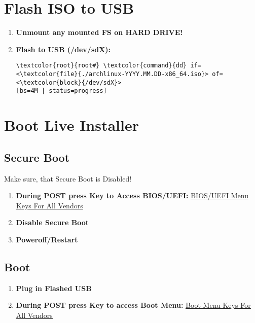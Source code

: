 \documentclass[10pt, a4paper, onecolumn, openany]{book} %
\begin{document}
\section{Flash ISO to USB}
\begin{enumerate}
    \item \textbf{Unmount any mounted FS on HARD DRIVE!}
    \item \textbf{Flash to USB (/dev/sdX):}
\begin{Verbatim}[commandchars=\\\{\}]
\textcolor{root}{root#} \textcolor{command}{dd} if=<\textcolor{file}{./archlinux-YYYY.MM.DD-x86_64.iso}> of=<\textcolor{block}{/dev/sdX}> 
[bs=4M | status=progress]
\end{Verbatim}
\end{enumerate}
\section{Boot Live Installer}
\subsection{Secure Boot}
Make sure, that Secure Boot is Disabled!
\begin{enumerate}
    \item \textbf{During POST press Key to Access BIOS/UEFI:}
\newline \underline{\href{https://techofide.com/blogs/boot-menu-option-keys-for-all-computers-and-laptops-updated-list-2021-techofide/}{BIOS/UEFI Menu Keys For All Vendors}}
    \item \textbf{Disable Secure Boot}
    \item \textbf{Poweroff/Restart}
\end{enumerate}
\subsection{Boot}
\begin{enumerate}
    \item \textbf{Plug in Flashed USB}
    \item \textbf{During POST press Key to access Boot Menu:}
\newline \underline{\href{https://techofide.com/blogs/boot-menu-option-keys-for-all-computers-and-laptops-updated-list-2021-techofide/}{Boot Menu Keys For All Vendors}}
\end{enumerate}
\end{document}
